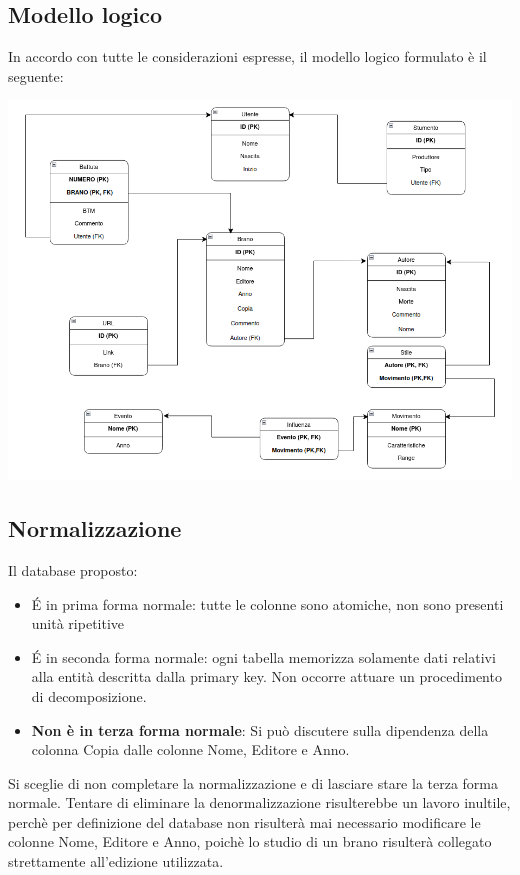 \documentclass{article}
\begin{document}
    \subsection{Modello logico}

    In accordo con tutte le considerazioni espresse, il modello logico formulato è il seguente:

    \begin{center}
        \includegraphics[width=\linewidth]{immagini/logico.png}
    \end{center}

    \subsection{Normalizzazione}

    Il database proposto:
    \begin{itemize}
        \item \'E in prima forma normale: tutte le colonne sono atomiche, non sono presenti unità ripetitive
        \item \'E in seconda forma normale: ogni tabella memorizza solamente dati relativi alla entità descritta dalla primary key. Non occorre attuare un procedimento di decomposizione.
        \item \textbf{Non è in terza forma normale}: Si può discutere sulla dipendenza della colonna Copia dalle colonne Nome, Editore e Anno.
    \end{itemize}

    Si sceglie di non completare la normalizzazione e di lasciare stare la terza forma normale. Tentare di eliminare la denormalizzazione risulterebbe un lavoro inultile, perchè per definizione
    del database non risulterà mai necessario modificare le colonne Nome, Editore e Anno, poichè lo studio di un brano risulterà collegato strettamente all'edizione utilizzata.
\end{document}
